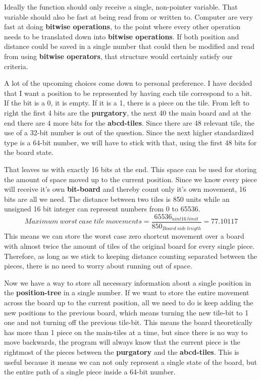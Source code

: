 \documentclass[12pt]{article}
\begin{document}
Ideally the function should only receive a single, non-pointer variable. That variable should also be fast at being read from or written to. 
Computer are very fast at doing \textbf{bitwise operations}, to the point where every other operation needs to be translated down into \textbf{bitwise operations}. If both position and distance could be saved in a single number that could then be modified and read from using \textbf{bitwise operators}, that structure would certainly satisfy our criteria.

A lot of the upcoming choices come down to personal preference. I have decided that I want a position to be represented by having each tile correspond to a bit. If the bit is a 0, it is empty. If it is a 1, there is a piece on the tile. From left to right the first 4 bits are the \textbf{purgatory}, the next 40 the main board and at the end there are 4 more bits for the \textbf{abcd-tiles}.
Since there are 48 relevant tile, the use of a 32-bit number is out of the question. Since the next higher standardized type is a 64-bit number, we will have to stick with that, using the first 48 bits for the board state.

That leaves us with exactly 16 bits at the end. This space can be used for storing the amount of space moved up to the current position. Since we know every piece will receive it's own \textbf{bit-board} and thereby count only it's own movement, 16 bits are all we need. The distance between two tiles is 850 units while an unsigned 16 bit integer can represent numbers from 0 to 65536.
\[
    Maximum~worst~case~tile ~movements = \frac{65536_{uint16~limit}}{850_{Board~side~length}} = 77.10117
\]
This means we can store the worst case zero shortcut movement over a board with almost twice the amount of tiles of the original board for every single piece. Therefore, as long as we stick to keeping distance counting separated between the pieces, there is no need to worry about running out of space.

Now we have a way to store all necessary information about a single position in the \textbf{position-tree} in a single number. If we want to store the entire movement across the board up to the current position, all we need to do is keep adding the new positions to the previous board, which means turning the new tile-bit to 1 one and not turning off the previous tile-bit. This means the board theoretically has more than 1 piece on the main-tiles at a time, but since there is no way to move backwards, the program will always know that the current piece is the rightmost of the pieces between the \textbf{purgatory} and the \textbf{abcd-tiles}. This is useful because it means we can not only represent a single state of the board, but the entire path of a single piece inside a 64-bit number.
\end{document}
